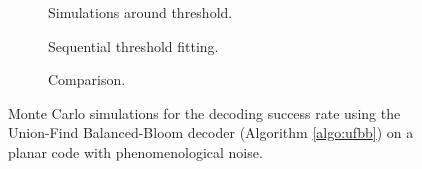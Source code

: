 \begin{figure}[htbp]
  \centering
  \begin{subfigure}[b]{0.49\textwidth}
    \begin{adjustbox}{Clip=0 1em 0 0}
      
    \end{adjustbox}
    \caption{Simulations around threshold.}
  \end{subfigure}
  \begin{subfigure}[b]{0.49\textwidth}
    \begin{adjustbox}{Clip=0 1em 0 0}
      
    \end{adjustbox}
    \caption{Sequential threshold fitting.}
  \end{subfigure}
  \begin{subfigure}[b]{\textwidth}
    \begin{adjustbox}{Clip=0 1em 0 0}
    
    \end{adjustbox}
    \caption{Comparison.}
  \end{subfigure}
  \caption{Monte Carlo simulations for the decoding success rate using the Union-Find Balanced-Bloom decoder (Algorithm \ref{algo:ufbb}) on a planar code with phenomenological noise.}
  \label{fig:thres_ufbb_planar_3d}
\end{figure}